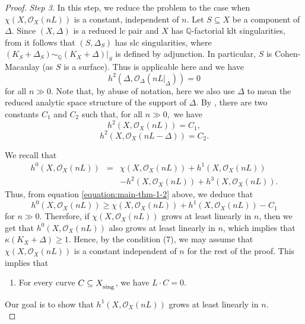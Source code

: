 \documentclass[12pt]{amsart}
\newcommand{\mbQ}{\mathbb{Q}}
\newcommand{\<}{\leq}
\def\>{\geq}
\def\subset{\subseteq}
\newcommand{\D}{\Delta}
\def\mcO{\mathcal{O}}
\theoremstyle{remark}
\theoremstyle{definition}
\theoremstyle{definition}
\numberwithin{equation}{section}
\theoremstyle{definition}
\theoremstyle{definition}
\def\sing{\operatorname{\textsubscript{\rm sing}}}
\begin{document}
\begin{proof}
\noindent
\textit{Step 3.}  
In this step, we reduce the problem to the case when $\chi(X,\mcO_X(nL))$ is a constant, independent of $n$. 
Let $S\subset X$ be a component of $\Delta$.
Since $(X,\Delta)$ is a reduced lc pair and $X$ has $\mbQ$-factorial klt singularities, from \cite[Remark 1.2(5)]{Fuj00} it follows that $(S, \Delta_S)$ has slc singularities, where $(K_S+\Delta_S)\sim_{\mbQ} (K_X+\Delta)|_S$ is defined by adjunction. In particular, $S$ is Cohen-Macaulay (as $S$ is a surface). 
Thus \cite[Lemma 8.1]{CHP16} is applicable here and we have  
\begin{equation}  \label{equation:main-thm-1-1}
    h^2(\Delta,\mcO_{\Delta}(nL|_{\Delta})) = 0
\end{equation} 
for all $n\gg 0$.
Note that, by abuse of notation, here we  also use $\D$ to mean the reduced analytic space structure of the support of $\D$.
By \cite[Corollary 8.1]{CHP16}, there are two constants $C_1$ and $C_2$ such that, for all $n \gg 0,$
we have 
\begin{equation} \label{equation:main-thm-1-2}
    h^2(X,\mcO_{X}(nL )) = C_1,
\end{equation}
\begin{equation}  \label{equation:main-thm-1-3}
    h^2(X,\mcO_{X}(nL - \Delta)) = C_2.
\end{equation} 

We  recall that 
\begin{eqnarray*} 
h^0(X, \mcO_{X}(nL)) 
&=& \chi(X,  \mcO_{X}(nL)) + h^1(X, \mcO_{X}(nL )) \\
& &    - h^2(X, \mcO_{X}(nL )) + h^3(X, \mcO_{X}(nL )).
\end{eqnarray*} 
Thus, from equation \eqref{equation:main-thm-1-2} above, we deduce that 
\begin{equation}\label{equation:Euler-estimate}
  h^0(X, \mcO_{X}(nL))  \ge    \chi(X,  \mcO_{X}(nL)) + h^1(X, \mcO_{X}(nL ))  - C_1
\end{equation}
for $n \gg 0$.
Therefore, if  $ \chi(X,\mcO_X({nL}))$ grows at least linearly in $n$, then  we get that $h^0(X,\mcO_{X}(nL ))$ also grows at least linearly in $n$, which implies that $\kappa(K_X+\Delta) \> 1$. 
Hence, by the condition (7), 
we may assume that $\chi(X,\mcO_X({nL})) $ is a constant independent of $n$ for the rest of the proof. 
This implies that 
\begin{enumerate}
    \item[(9)] For every curve $C\subseteq X_{\sing}$, we have $L\cdot C =0$.  
\end{enumerate}
Our  goal is to show that $h^1(X,\mcO_X(nL))$ grows at least linearly in $n$.\\


\end{proof}
\end{document}
